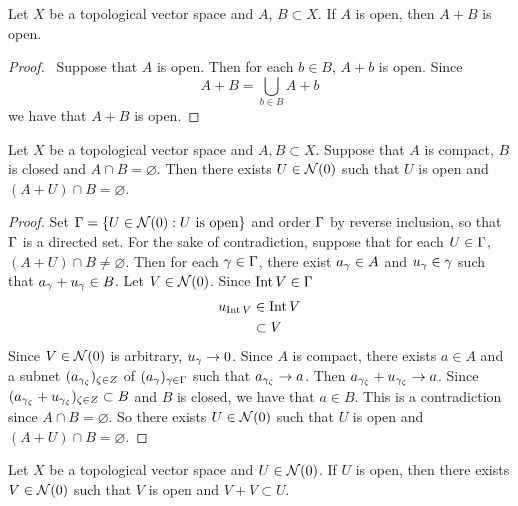 \documentclass{book}
\begin{document}
	\begin{ex}
		Let $X$ be a topological vector space and $A$, $B \subset X$. If $A$ is open, then $A + B$ is open.
	\end{ex}
	
	\begin{proof} \
		Suppose that $A$ is open. Then for each $b \in B$, $A + b$ is open. Since 
		$$A + B = \bigcup_{b \in B} A + b$$
		we have that $A + B$ is open.
	\end{proof}

	\begin{ex}
		Let $X$ be a topological vector space and $A,B \subset X$. Suppose that $A$ is compact, $B$ is closed and $A \cap B = \varnothing$. Then there exists $U \in \mathcal{N}(0)$ such that $U$ is open and $(A + U) \cap B = \varnothing$. 
	\end{ex}
	
	\begin{proof}
		Set $\Gamma = \{U \in \mathcal{N}(0): U \text{ is open}\}$ and order $\Gamma$ by reverse inclusion, so that $\Gamma$ is a directed set. For the sake of contradiction, suppose that for each $U \in \Gamma$, $(A + U) \cap B \neq \varnothing$. Then for each $\gamma \in \Gamma$, there exist $a_{\gamma} \in A$ and $u_{\gamma} \in \gamma$ such that $a_{\gamma} + u_{\gamma} \in B$. Let $V \in \mathcal{N}(0)$. Since $\operatorname{Int} V \in \Gamma$
		\begin{align*}
			u_{\operatorname{Int} V} 
			& \in \operatorname{Int} V \\
			& \subset V
		\end{align*}
		Since $V \in \mathcal{N}(0)$ is arbitrary, $u_{\gamma} \rightarrow 0$.  Since $A$ is compact, there exists $a \in A$ and a subnet $(a_{\gamma_{\zeta}})_{\zeta \in Z}$ of $(a_{\gamma})_{\gamma \in \Gamma}$ such that $a_{\gamma_{\zeta}} \rightarrow a$. Then $a_{\gamma_{\zeta}} + u_{\gamma_{\zeta}} \rightarrow a$. Since $(a_{\gamma_{\zeta}} + u_{\gamma_{\zeta}})_{\zeta \in Z} \subset B$ and $B$ is closed, we have that $a \in B$. This is a contradiction since $A \cap B = \varnothing$. So there exists $U \in \mathcal{N}(0)$ such that $U$ is open and $(A+U) \cap B = \varnothing$.
	\end{proof}

	\begin{ex}
		Let $X$ be a topological vector space and $U \in \mathcal{N}(0)$. If $U$ is open, then there exists $V \in \mathcal{N}(0)$ such that $V$ is open and $V+V \subset U$.
	\end{ex}
\end{document}
